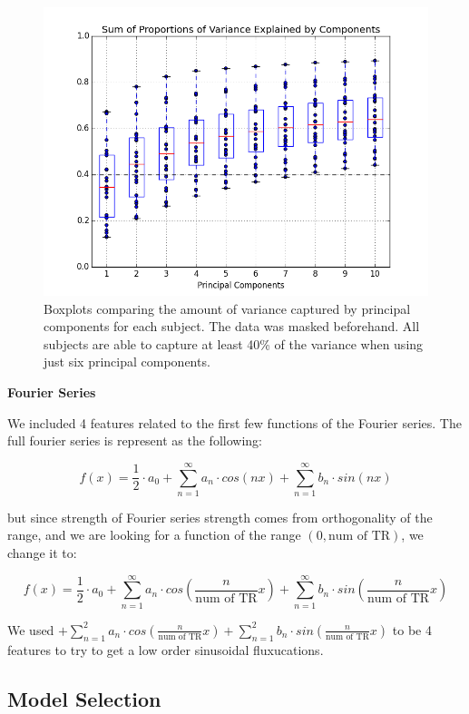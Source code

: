 \begin{figure}[ht]
	\centering
	\includegraphics[width=.5\linewidth]{../images/pcaBOX.png}
 	\caption{Boxplots comparing the amount of variance captured by principal 
components for each subject. The data was masked beforehand. All subjects are 
able to capture at least 40\% of the variance when using just six principal 
components.}
 	\label{fig:pcabox}
\end{figure}


\vspace{2mm}
\textbf{Fourier Series}
\vspace{2mm}
\par We included 4 features related to the first few functions of the Fourier series.
The full fourier series is represent as the following:

\begin{equation}
f(x) = \frac{1}{2} \cdot a_0 + \sum_{n=1}^{\infty} a_n \cdot cos(n x) + \sum_{n=1}^{\infty} b_n \cdot  sin(n x)
\end{equation}

but since strength of Fourier series strength comes from orthogonality of the range, 
and we are looking for a function of the range $(0, \text{num of TR})$, we change it to:

\begin{equation}
f(x) = \frac{1}{2} \cdot a_0 + \sum_{n=1}^{\infty} a_n \cdot cos(\frac{n}{\text{num of TR}} x) + \sum_{n=1}^{\infty} b_n \cdot sin(\frac{n}{\text{num of TR}} x)
\end{equation}

We used $ + \sum_{n=1}^{2} a_n \cdot cos(\frac{n}{\text{num of TR}} x) + 
\sum_{n=1}^{2} b_n \cdot sin(\frac{n}{\text{num of TR}} x)$ to be 4 features to try 
to get a low order sinusoidal fluxucations.

\subsection{Model Selection}

